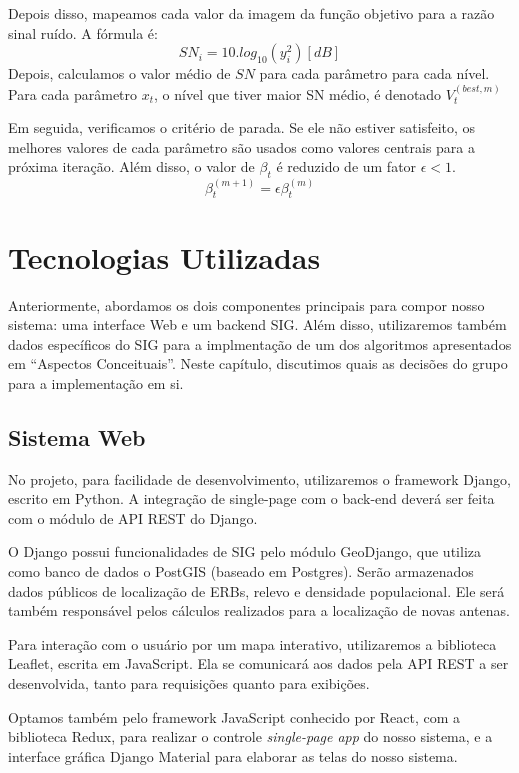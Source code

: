 \documentclass[]{politex}
\begin{document}
Depois disso, mapeamos cada valor da imagem da função objetivo para a razão
sinal ruído. A fórmula é:
\begin{equation*}
    SN_i = 10.log_{10}(y_i^2) [dB]
\end{equation*}
Depois, calculamos o valor médio de $SN$ para cada parâmetro para cada nível.
Para cada parâmetro $x_t$, o nível que tiver maior SN médio, é denotado
$V_t^{(best, m)}$

Em seguida, verificamos o critério de parada. Se ele não estiver satisfeito, os
melhores valores de cada parâmetro são usados como valores centrais para a
próxima iteração. Além disso, o valor de $\beta_t$ é reduzido de um fator $\epsilon < 1$.
\begin{equation*}
    \beta_t^{(m+1)} = \epsilon\beta_t^{(m)}
\end{equation*}

\chapter{Tecnologias Utilizadas}

Anteriormente, abordamos os dois componentes principais para compor nosso
sistema: uma interface Web e um backend SIG. Além disso, utilizaremos também
dados específicos do SIG para a implmentação de um dos algoritmos apresentados
em ``Aspectos Conceituais''. Neste capítulo, discutimos quais as decisões do
grupo para a implementação em si.

\section{Sistema Web}
No projeto, para facilidade de desenvolvimento, utilizaremos o framework Django,
escrito em Python. A integração de single-page com o back-end deverá ser feita
com o módulo de API REST do Django.

O Django possui funcionalidades de SIG pelo módulo GeoDjango, que utiliza como
banco de dados o PostGIS (baseado em Postgres). Serão armazenados
dados públicos de localização de ERBs, relevo e densidade populacional. Ele
será também responsável pelos cálculos realizados para a localização de novas
antenas.

Para interação com o usuário por um mapa interativo, utilizaremos a biblioteca
Leaflet, escrita em JavaScript. Ela se comunicará aos dados pela API REST a ser
desenvolvida, tanto para requisições quanto para exibições.

Optamos também pelo framework JavaScript conhecido por React, com a biblioteca
Redux, para realizar o controle \emph{single-page app} do nosso sistema, e a
interface gráfica Django Material para elaborar as telas do nosso sistema.
\end{document}
